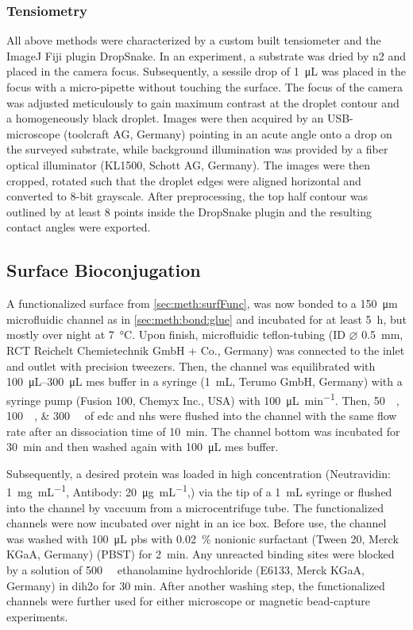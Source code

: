 \subsubsection{Tensiometry}
All above methods were characterized by a custom built tensiometer and the ImageJ Fiji plugin DropSnake. \cite{lit:chem:Fiji,lit:chem:surfaceTension}
In an experiment, a substrate was dried by \gls{n2} and placed in the camera focus. Subsequently, a sessile drop of \SI{1}{\micro\liter} was placed in the focus with a micro-pipette without touching the surface. The focus of the camera was adjusted meticulously to gain maximum contrast at the droplet contour and a homogeneously black droplet. Images were then acquired by an USB-microscope (toolcraft AG, Germany)
pointing in an acute angle onto a drop on the surveyed substrate, while background illumination was provided by a fiber optical illuminator (KL1500, Schott AG, Germany). The images were then cropped, rotated such that the droplet edges were aligned horizontal and converted to 8-bit grayscale. After preprocessing, the top half contour was outlined by at least 8 points inside the DropSnake plugin and the resulting contact angles were exported.
\subsection{Surface Bioconjugation}
\label{sec:meth:surfBio}
A functionalized surface from \ref{sec:meth:surfFunc}, was now bonded to a \SI{150}{\micro\meter} microfluidic channel as in \ref{sec:meth:bond:glue} and incubated for at least \SI{5}{\hour}, but mostly over night at \SI{7}{\degreeCelsius}. Upon finish, microfluidic teflon-tubing (ID $\varnothing$ \SI{0.5}{\milli\meter}, RCT Reichelt Chemietechnik GmbH + Co., Germany)  was connected to the inlet and outlet with precision tweezers. Then, the channel was equilibrated with \SIrange{100}{300}{\micro\liter} \gls{mes} buffer in a syringe (\SI{1}{\milli\liter}, Terumo GmbH, Germany) with a syringe pump (Fusion 100, Chemyx Inc., USA) with \SI{100}{\micro\liter\per\minute}. Then, \SIlist{50;100;300}{\milli\molar} of \gls{edc} and \gls{nhs} were flushed into the channel with the same flow rate after an dissociation time of \SI{10}{\minute}. The channel bottom was incubated for \SI{30}{\minute} and then washed again with \SI{100}{\micro\liter} \gls{mes} buffer. 

Subsequently, a desired protein was loaded in high concentration (Neutravidin: \SI{1}{\milli\gram\per\milli\liter}, Antibody: \SI{20}{\micro\gram\per\milli\liter},) via the tip of a \SI{1}{\milli\liter} syringe or flushed into the channel by vaccuum from a microcentrifuge tube. The functionalized channels were now incubated over night in an ice box. Before use, the channel was washed with \SI{100}{\micro\liter} \gls{pbs} with \SI{0.02}{\percent} nonionic surfactant (Tween 20, Merck KGaA, Germany) (PBST) for \SI{2}{\minute}. Any unreacted binding sites were blocked by a solution of \SI{500}{\milli\molar} ethanolamine hydrochloride (E6133, Merck KGaA, Germany) in \gls{dih2o} for 30 min. After another washing step, the functionalized channels were further used for either microscope or magnetic bead-capture experiments.

